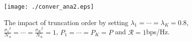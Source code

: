 \documentclass[12pt,onecolumn,draftcls]{IEEEtran}
\newcommand{\bs}{\boldsymbol}
\begin{document}
\begin{figure}
  \centering
  \texttt{[image: ./conver\_ana2.eps]}\\
  \caption{The impact of truncation order by setting $\lambda_1=\cdots=\lambda_K=0.8$, $\frac{{\sigma_1}^2}{\mathcal N_0}=\cdots=\frac{{\sigma_K}^2}{\mathcal N_0}=1$, $P_1=\cdots=P_K=P$ and $\mathcal R=1$bps/Hz.}\label{fig:N_K}%
\end{figure}
%
\end{document}
